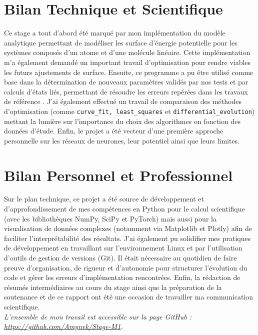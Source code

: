 \documentclass[11pt, a4paper, openany]{report}
\begin{document}
\section{Bilan Technique et Scientifique}

\noindent Ce stage a tout d'abord été marqué par mon implémentation du modèle analytique
permettant de modéliser les surface d'énergie potentielle pour les systèmes
composés d'un atome et d'une molécule linéaire. Cette implémentation m'a
également demandé un important travail d'optimisation pour rendre viables les
futurs ajustements de surface. Ensuite, ce programme a pu être utilisé comme base dans
la détermination de nouveaux paramètres validés par nos tests et par calculs
d'états liés, permettant de résoudre les erreurs repérées dans les
travaux de référence \cite{ref1}. J'ai également effectué un travail de 
comparaison des méthodes d'optimisation (comme \texttt{curve\_fit, 
least\_squares} et \texttt{differential\_evolution}) mettant la lumière sur
l'importance du choix des algorithmes on fonction des données d'étude. 
Enfin, le projet a été vecteur d'une première approche personnelle sur les 
réseaux de neurones, leur potentiel ainsi que leurs limites.

\section{Bilan Personnel et Professionnel}

\noindent Sur le plan technique, ce projet a été source de développement et 
d'approfondissement de mes compétences en Python pour le calcul scientifique
(avec les bibliothèques NumPy, SciPy et PyTorch) mais aussi pour la visualisation
de données complexes (notamment via Matplotlib et Plotly) afin de faciliter
l'interprétabilité des résultats. J'ai également pu solidifier mes pratiques
de développement en travaillant sur l'environnement Linux et par l'utilisation
d'outils de gestion de versions (Git). Il était nécessaire au quotidien de 
faire preuve d'organisation, de rigueur et d'autonomie pour structurer
l'évolution du code et gérer les erreurs d'implémentation rencontrées. Enfin,
la rédaction de résumés intermédiaires au cours du stage ainsi que la 
préparation de la soutenance et de ce rapport ont été une occasion de travailler
ma communication scientifique.\\

\noindent \textit{L'ensemble de mon travail est accessible sur la page GitHub :
\url{https://github.com/Amynek/Stage-M1}.}
\end{document}
